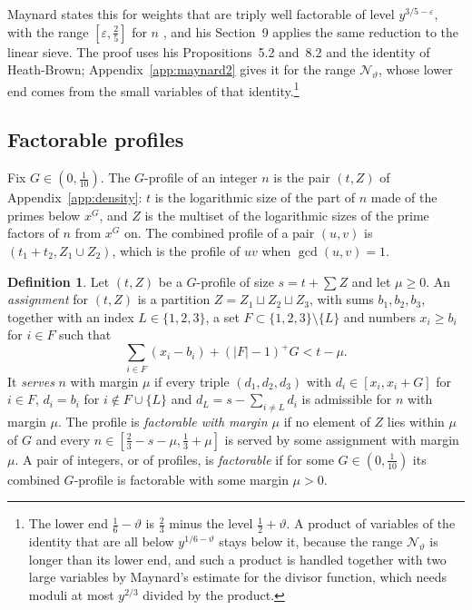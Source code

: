 \documentclass[aps,prd,twocolumn,superscriptaddress,nofootinbib,longbibliography,floatfix,showkeys,nobalancelastpage,amsmath,amssymb,10pt]{revtex4-2}
\theoremstyle{plain}
\theoremstyle{definition}
\newtheorem{definition}[theorem]{Definition}
\theoremstyle{plain}
\newcommand{\eps}{\varepsilon}
\begin{document}
Maynard states this for weights that are triply well factorable of level $y^{3/5-\eps}$, with the range $[\eps,\frac25]$ for $n$ \cite[Theorem~1.1]{May2}, and his Section~9 applies the same reduction to the linear sieve. The proof uses his Propositions~5.2 and~8.2 and the identity of Heath-Brown; Appendix~\ref{app:maynard2} gives it for the range $\mathcal N_\vartheta$, whose lower end comes from the small variables of that identity.\footnote{The lower end $\frac16-\vartheta$ is $\frac23$ minus the level $\frac12+\vartheta$. A product of variables of the identity that are all below $y^{1/6-\vartheta}$ stays below it, because the range $\mathcal N_\vartheta$ is longer than its lower end, and such a product is handled together with two large variables by Maynard's estimate for the divisor function, which needs moduli at most $y^{2/3}$ divided by the product.}

\subsection{Factorable profiles}

Fix $G\in(0,\frac1{10})$. The $G$-profile of an integer $n$ is the pair $(t,Z)$ of Appendix~\ref{app:density}: $t$ is the logarithmic size of the part of $n$ made of the primes below $x^G$, and $Z$ is the multiset of the logarithmic sizes of the prime factors of $n$ from $x^G$ on. The combined profile of a pair $(u,v)$ is $(t_1+t_2,Z_1\cup Z_2)$, which is the profile of $uv$ when $\gcd(u,v)=1$.

\begin{definition}\label{def:factorable}
Let $(t,Z)$ be a $G$-profile of size $s=t+\sum Z$ and let $\mu\ge0$. An \emph{assignment} for $(t,Z)$ is a partition $Z=Z_1\sqcup Z_2\sqcup Z_3$, with sums $b_1,b_2,b_3$, together with an index $L\in\{1,2,3\}$, a set $F\subset\{1,2,3\}\setminus\{L\}$ and numbers $x_i\ge b_i$ for $i\in F$ such that
\begin{equation}\label{eq:budget}
\sum_{i\in F}(x_i-b_i)+(|F|-1)^+G<t-\mu.
\end{equation}
It \emph{serves} $n$ with margin $\mu$ if every triple $(d_1,d_2,d_3)$ with $d_i\in[x_i,x_i+G]$ for $i\in F$, $d_i=b_i$ for $i\notin F\cup\{L\}$ and $d_L=s-\sum_{i\ne L}d_i$ is admissible for $n$ with margin $\mu$. The profile is \emph{factorable with margin $\mu$} if no element of $Z$ lies within $\mu$ of $G$ and every $n\in[\frac23-s-\mu,\frac13+\mu]$ is served by some assignment with margin $\mu$. A pair of integers, or of profiles, is \emph{factorable} if for some $G\in(0,\frac1{10})$ its combined $G$-profile is factorable with some margin $\mu>0$.
\end{definition}
\end{document}

